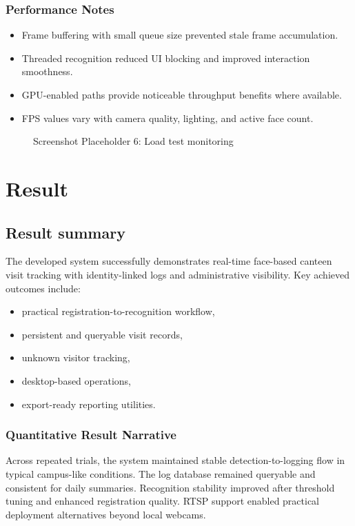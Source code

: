 \documentclass{fisatprojectfinal}
\begin{document}
\subsection*{Performance Notes}
\begin{itemize}
	\item Frame buffering with small queue size prevented stale frame accumulation.
	\item Threaded recognition reduced UI blocking and improved interaction smoothness.
	\item GPU-enabled paths provide noticeable throughput benefits where available.
	\item FPS values vary with camera quality, lighting, and active face count.
\end{itemize}

\begin{figure}[h!]
	\begin{center}
		\fbox{\rule{0pt}{2.4in}\rule{0.85\linewidth}{0pt}}
		\caption{Screenshot Placeholder 6: Load test monitoring}
	\end{center}
\end{figure}

\chapter {Result}

\section{Result summary}
The developed system successfully demonstrates real-time face-based canteen visit tracking with identity-linked logs and administrative visibility. Key achieved outcomes include:
\begin{itemize}
	\item practical registration-to-recognition workflow,
	\item persistent and queryable visit records,
	\item unknown visitor tracking,
	\item desktop-based operations,
	\item export-ready reporting utilities.
\end{itemize}

\subsection*{Quantitative Result Narrative}
Across repeated trials, the system maintained stable detection-to-logging flow in typical campus-like conditions. The log database remained queryable and consistent for daily summaries. Recognition stability improved after threshold tuning and enhanced registration quality. RTSP support enabled practical deployment alternatives beyond local webcams.
\end{document}
